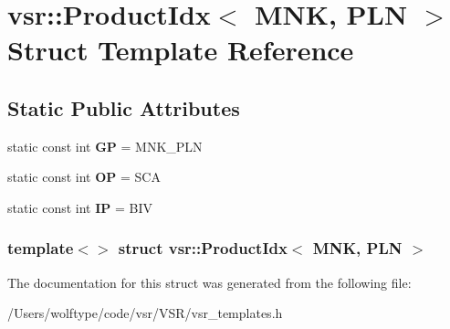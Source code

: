 \hypertarget{structvsr_1_1_product_idx_3_01_m_n_k_00_01_p_l_n_01_4}{\section{vsr\-:\-:Product\-Idx$<$ M\-N\-K, P\-L\-N $>$ Struct Template Reference}
\label{structvsr_1_1_product_idx_3_01_m_n_k_00_01_p_l_n_01_4}
}
\subsection*{Static Public Attributes}
\begin{DoxyCompactItemize}
\item 
\hypertarget{structvsr_1_1_product_idx_3_01_m_n_k_00_01_p_l_n_01_4_ac1958ab2137334750941dac06d829e0a}{static const int {\bfseries G\-P} = M\-N\-K\-\_\-\-P\-L\-N}\label{structvsr_1_1_product_idx_3_01_m_n_k_00_01_p_l_n_01_4_ac1958ab2137334750941dac06d829e0a}

\item 
\hypertarget{structvsr_1_1_product_idx_3_01_m_n_k_00_01_p_l_n_01_4_abdfbd7dedda6fc4bf0bdc7cb81544f7e}{static const int {\bfseries O\-P} = S\-C\-A}\label{structvsr_1_1_product_idx_3_01_m_n_k_00_01_p_l_n_01_4_abdfbd7dedda6fc4bf0bdc7cb81544f7e}

\item 
\hypertarget{structvsr_1_1_product_idx_3_01_m_n_k_00_01_p_l_n_01_4_a9e791a2f3e054b19facc640a28119f74}{static const int {\bfseries I\-P} = B\-I\-V}\label{structvsr_1_1_product_idx_3_01_m_n_k_00_01_p_l_n_01_4_a9e791a2f3e054b19facc640a28119f74}

\end{DoxyCompactItemize}
\subsubsection*{template$<$$>$ struct vsr\-::\-Product\-Idx$<$ M\-N\-K, P\-L\-N $>$}



The documentation for this struct was generated from the following file\-:\begin{DoxyCompactItemize}
\item 
/\-Users/wolftype/code/vsr/\-V\-S\-R/vsr\-\_\-templates.\-h\end{DoxyCompactItemize}

